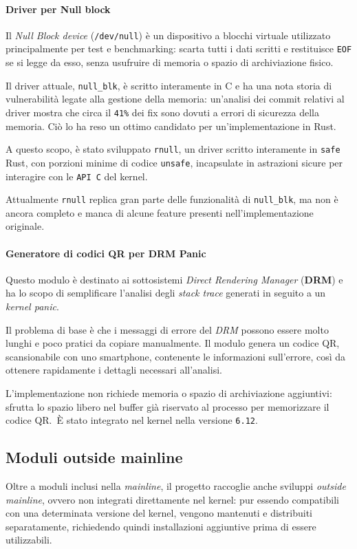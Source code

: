\paragraph{Driver per Null block}
Il \textit{Null Block device} (\texttt{/dev/null}) è un dispositivo a blocchi virtuale utilizzato principalmente per test e benchmarking: scarta tutti i dati scritti e restituisce \texttt{EOF} se si legge da esso, senza usufruire di memoria o spazio di archiviazione fisico.

Il driver attuale, \texttt{null\_blk}, è scritto interamente in C e ha una nota storia di vulnerabilità legate alla gestione della memoria: un'analisi dei 
commit relativi al driver mostra che circa il \texttt{41\%} dei fix sono dovuti a errori di sicurezza della memoria\cite{null-blk}.
Ciò lo ha reso un ottimo candidato per un'implementazione in Rust.

A questo scopo, è stato sviluppato \texttt{rnull}, un driver scritto interamente in \texttt{safe} Rust, con porzioni minime di codice \texttt{unsafe}, incapsulate in astrazioni sicure
 per interagire con le \texttt{API C} del kernel.

 Attualmente \texttt{rnull} replica gran parte delle funzionalità di \texttt{null\_blk}, ma non è ancora completo e manca di alcune feature presenti nell'implementazione originale.

\paragraph{Generatore di codici QR per DRM Panic}
Questo modulo è destinato ai sottosistemi \textit{Direct Rendering Manager} (\textbf{DRM}) e ha lo scopo di semplificare l'analisi degli 
\textit{stack trace} generati in seguito a un \textit{kernel panic}.

Il problema di base è che i messaggi di errore del \textit{DRM} possono essere molto lunghi e poco pratici da copiare manualmente.
Il modulo genera un codice QR, scansionabile con uno smartphone, contenente le informazioni sull'errore, così da ottenere 
rapidamente i dettagli necessari all'analisi.

L'implementazione non richiede memoria o spazio di archiviazione aggiuntivi: sfrutta lo spazio 
libero nel buffer già riservato al processo per memorizzare il codice QR.\ 
È stato integrato nel kernel nella versione \texttt{6.12}.

\subsection{Moduli outside mainline}
Oltre a moduli inclusi nella \textit{mainline}, il progetto raccoglie anche sviluppi \textit{outside mainline}, ovvero non integrati direttamente nel kernel: 
pur essendo compatibili con una determinata versione del kernel, vengono mantenuti e distribuiti separatamente, richiedendo quindi installazioni
 aggiuntive prima di essere utilizzabili.

